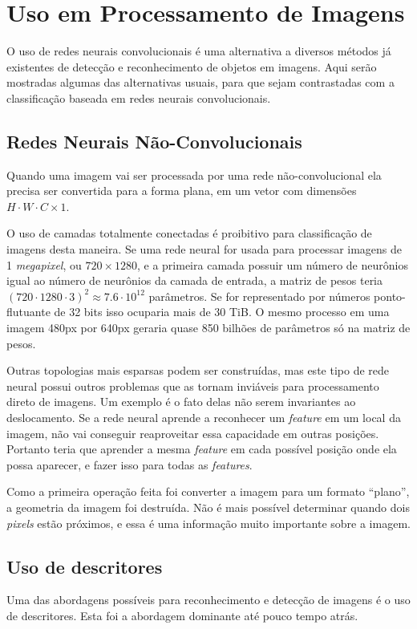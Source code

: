 \section{Uso em Processamento de Imagens}
O uso de redes neurais convolucionais é uma alternativa a diversos métodos já
existentes de detecção e reconhecimento de objetos em imagens. Aqui serão
mostradas algumas das alternativas usuais, para que sejam contrastadas
com a classificação baseada em redes neurais convolucionais.

\subsection{Redes Neurais Não-Convolucionais}
Quando uma imagem vai ser processada por uma rede não-convolucional ela precisa
ser convertida para a forma plana, em um vetor com dimensões
$H \cdot W \cdot C \times 1$.

O uso de camadas totalmente conectadas é proibitivo para classificação de
imagens desta maneira. Se uma rede neural for usada para processar imagens de 1
\emph{megapixel}, ou $720 \times 1280$, e a primeira camada possuir um
número de neurônios igual
ao número de neurônios da camada de entrada, a matriz de pesos teria
$(720 \cdot 1280 \cdot 3)^2 \approx 7.6 \cdot 10^{12}$ parâmetros. Se for
representado por números ponto-flutuante de 32 bits isso ocuparia mais de
30 TiB. O mesmo processo em uma imagem 480px por 640px geraria quase 850
bilhões de parâmetros só na matriz de pesos.

Outras topologias mais esparsas podem ser construídas, mas este tipo de rede
neural possui outros problemas que as tornam inviáveis para processamento direto
de imagens. Um exemplo é o fato delas não serem invariantes ao deslocamento. Se
a rede neural aprende a reconhecer um \emph{feature} em um local da
imagem, não vai
conseguir reaproveitar essa capacidade em outras posições. Portanto teria que
aprender a mesma \emph{feature} em cada possível posição onde ela possa
aparecer, e fazer isso para todas as \emph{features}.

Como a primeira operação feita foi converter a imagem para um formato “plano”, a
geometria da imagem foi destruída. Não é mais possível determinar quando dois
\emph{pixels} estão próximos, e essa é uma informação muito importante sobre a
imagem.

\subsection{Uso de descritores}
Uma das abordagens possíveis para reconhecimento e detecção de imagens é o uso
de descritores. Esta foi a abordagem dominante até pouco tempo atrás.

